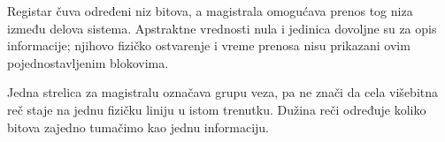 
Registar čuva određeni niz bitova, a magistrala omogućava prenos tog niza između delova sistema. Apstraktne vrednosti nula i jedinica dovoljne su za opis informacije; njihovo fizičko ostvarenje i vreme prenosa nisu prikazani ovim pojednostavljenim blokovima.

Jedna strelica za magistralu označava grupu veza, pa ne znači da cela višebitna reč staje na jednu fizičku liniju u istom trenutku. Dužina reči određuje koliko bitova zajedno tumačimo kao jednu informaciju.
